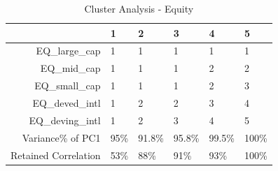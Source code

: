 \begin{longtable}{rlllll}
\caption{Cluster Analysis - Equity} \\ 
  \hline
 & 1 & 2 & 3 & 4 & 5 \\ 
  \hline
EQ\_large\_cap & 1 & 1 & 1 & 1 & 1 \\ 
  EQ\_mid\_cap & 1 & 1 & 1 & 2 & 2 \\ 
  EQ\_small\_cap & 1 & 1 & 1 & 2 & 3 \\ 
  EQ\_deved\_intl & 1 & 2 & 2 & 3 & 4 \\ 
  EQ\_deving\_intl & 1 & 2 & 3 & 4 & 5 \\ 
  Variance\% of PC1 & 95\% & 91.8\% & 95.8\% & 99.5\% & 100\% \\ 
  Retained Correlation & 53\% & 88\% & 91\% & 93\% & 100\% \\ 
   \hline
\hline
\end{longtable}
